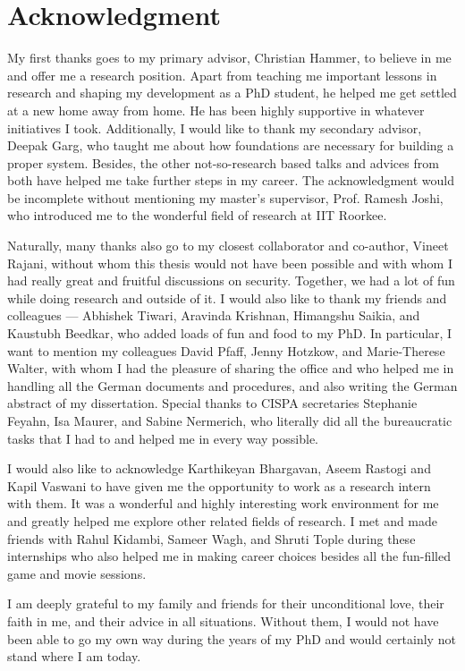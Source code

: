 \section*{Acknowledgment}

My first thanks goes to my primary advisor, Christian Hammer, to believe 
in me and offer me a research position. Apart from teaching me
important lessons in research and shaping my development as a PhD
student, he helped me get settled at a new home away from home. He has
been highly supportive in whatever initiatives I took. Additionally, I
would like to thank my secondary advisor, Deepak Garg, who taught me
about how foundations are necessary for building a proper
system. Besides, the other not-so-research based talks and advices
from both have helped me take further steps in my career. The
acknowledgment would be incomplete without mentioning my master's
supervisor, Prof. Ramesh Joshi, who introduced me to the wonderful
field of research at IIT Roorkee.

Naturally, many thanks also go to my closest collaborator and
co-author, Vineet Rajani, without whom this thesis would not have been
possible and with whom I had really great and fruitful discussions on
security. Together, we had a lot of fun while doing research and
outside of it. I would also like to thank my friends and colleagues
--- Abhishek Tiwari, Aravinda Krishnan, Himangshu Saikia, and
Kaustubh Beedkar, who added loads of fun and food to my
PhD. In particular, I want to mention my colleagues
David Pfaff, Jenny Hotzkow, and Marie-Therese Walter, with whom I had
the pleasure of sharing the office and who helped me in handling all
the German documents and procedures, and also writing the German
abstract of my dissertation. Special thanks to CISPA
secretaries Stephanie Feyahn, Isa Maurer, and Sabine Nermerich, who
literally did all the bureaucratic tasks that I had to and helped me
in every way possible.

I would also like to acknowledge Karthikeyan
Bhargavan, Aseem Rastogi and Kapil Vaswani to have given me the
opportunity to work as a research intern with them. It was a wonderful 
and highly interesting work environment for me and greatly helped
me explore other related fields of research. I met and made friends
with Rahul Kidambi, Sameer Wagh, and Shruti Tople during these
internships who also helped me in making career choices besides
all the fun-filled game and movie sessions. 

I am deeply grateful to my family and friends
for their unconditional love, their faith in me, and their advice in all
situations. Without them, I would not have been able to go my own way
during the years of my PhD and would certainly not stand where I am 
today. 

